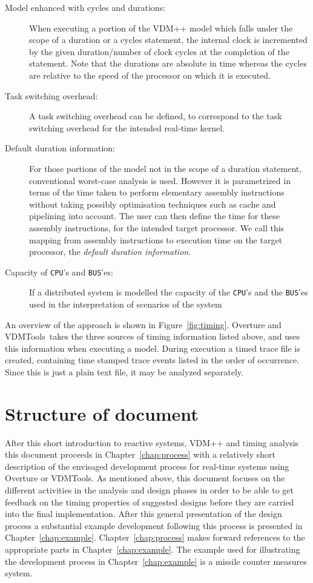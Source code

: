 \documentclass{overturerepchap}
\newcommand{\vdmtools}{VDMTools}
\newcommand{\VDMTools}{VDMTools}
\begin{document}
\begin{description}
\item[Model enhanced with cycles and durations:] When executing a 
portion of the VDM++ model which falls under the scope of a duration
or a cycles statement, the internal clock is incremented by the given
duration/number of clock cycles at the completion of the
statement. Note that the durations are absolute in time whereas the
cycles are relative to the speed of the processor on which it is
executed.
\item[Task switching overhead:] A task switching overhead can be
defined, to correspond to the task switching overhead for the intended
real-time kernel.
\item[Default duration information:] For those portions of the model
not in the scope of a duration statement, conventional worst-case
analysis is used. However it is parametrized in terms of the time
taken to perform elementary assembly instructions without taking
possibly optimisation techniques such as cache and pipelining into
account. The user can then define the time for these assembly
instructions, for the intended target processor. We call this mapping
from assembly instructions to execution time on the target processor,
the \emph{default duration information}.
\item[Capacity of \texttt{CPU}'s and \texttt{BUS}'es:] If a distributed system is modelled
the capacity of the \texttt{CPU}'s and the \texttt{BUS}'es used in the
interpretation of scenarios of the system
\end{description}

An overview of the approach is shown in
Figure~\ref{fig:timing}. Overture and \vdmtools\
takes the three sources of timing information
listed above, and uses this information when executing a model. During
execution a timed trace file is created, containing time stamped trace
events listed in the order of occurrence. Since this is just a plain
text file, it may be analyzed separately.

\section{Structure of document}

After this short introduction to reactive systems, VDM++ and timing
analysis this document proceeds in Chapter~\ref{chap:process} with a
relatively short description of the envisaged development process for
real-time systems using Overture or 
\VDMTools. As mentioned above, this document
focuses on the different activities in the analysis and design phases
in order to be able to get feedback on the timing properties of
suggested designs before they are carried into the final
implementation. After this general presentation of the design process
a substantial example development following this process is presented
in Chapter~\ref{chap:example}. Chapter~\ref{chap:process} makes
forward references to the appropriate parts in
Chapter~\ref{chap:example}.  The example used for illustrating the
development process in Chapter~\ref{chap:example} is a missile counter
measures system.
\end{document}
